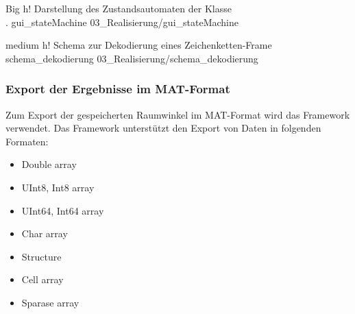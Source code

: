          {Big}                                              %
         {h!}                                                  %
         {Darstellung des Zustandsautomaten der Klasse\\.}       %
         {gui_stateMachine}                                 %
         {03_Realisierung/gui_stateMachine}


         {medium}                                              %
         {h!}                                                  %
         {Schema zur Dekodierung eines Zeichenketten-Frame}       %
         {schema_dekodierung}                                 %
         {03_Realisierung/schema_dekodierung}





    

\subsubsection{Export der Ergebnisse im MAT-Format}
Zum Export der gespeicherten Raumwinkel im MAT-Format wird das Framework \cite{web_jMatIO} verwendet. Das Framework unterstützt den Export von Daten in folgenden \matlab Formaten:

\begin{itemize}
    \item Double array 
    \item UInt8, Int8 array 
    \item UInt64, Int64 array 
    \item Char array 
    \item Structure 
    \item Cell array 
    \item Sparase array
\end{itemize}


